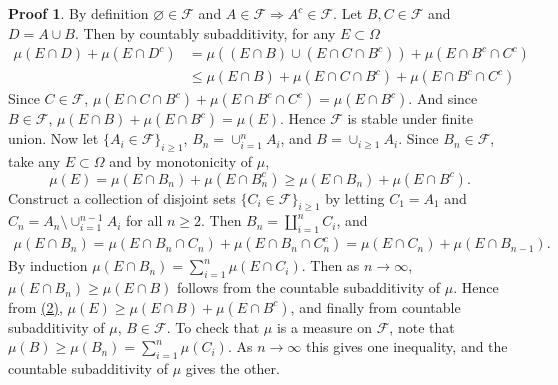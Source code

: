 \documentclass[hidelinks,11pt]{article}
\theoremstyle{definition}
\theoremstyle{dotless}
\newtheorem{prop}{Proof}[section]
\theoremstyle{remark}
\DeclareMathOperator{\1}{\mathbf{1}}
\DeclareMathOperator{\0}{\mathbf{0}}
\begin{document}
\begin{prop}
By definition $\varnothing\in\mathcal{F}$ and $A\in\mathcal{F}\Rightarrow A^c\in\mathcal{F}$. Let $B,C\in\mathcal{F}$ and $D=A\cup B$. Then by countably subadditivity, for any $E\subset\Omega$
\begin{align*}
\mu(E\cap D)+\mu(E\cap D^c)&=\mu((E\cap B)\cup(E\cap C\cap B^c))+\mu(E\cap B^c\cap C^c)\\
&\leq\mu(E\cap B)+\mu(E\cap C\cap B^c)+\mu(E\cap B^c\cap C^c)
\end{align*}
Since $C\in\mathcal{F}$, $\mu(E\cap C\cap B^c)+\mu(E\cap B^c\cap C^c)=\mu(E\cap B^c)$. And since $B\in\mathcal{F}$, $\mu(E\cap B)+\mu(E\cap B^c)=\mu(E)$. Hence $\mathcal{F}$ is stable under finite union.\medbreak
Now let $\{A_i\in\mathcal{F}\}_{i\geq1}$, $B_n=\cup_{i=1}^nA_i$, and $B=\cup_{i\geq1}A_i$. Since $B_n\in\mathcal{F}$, take any $E\subset\Omega$ and by monotonicity of $\mu$,
\[\mu(E)=\mu(E\cap B_n)+\mu(E\cap B_n^c)\geq\mu(E\cap B_n)+\mu(E\cap B^c).\]
Construct a collection of disjoint sets $\{C_i\in\mathcal{F}\}_{i\geq1}$ by letting $C_1=A_1$ and $C_n=A_n\setminus\cup_{i=1}^{n-1}A_i$ for all $n\geq2$. Then $B_n=\amalg_{i=1}^nC_i$, and
\begin{align}\label{(2)}
\mu(E\cap B_n)=\mu(E\cap B_n\cap C_n)+\mu(E\cap B_n\cap C_n^c)=\mu(E\cap C_n)+\mu(E\cap B_{n-1}).
\end{align}
By induction $\mu(E\cap B_n)=\sum_{i=1}^n\mu(E\cap C_i)$. Then as $n\to\infty$, $\mu(E\cap B_n)\geq\mu(E\cap B)$ follows from the countable subadditivity of $\mu$. Hence from \hyperref[(2)]{(2)}, $\mu(E)\geq\mu(E\cap B)+\mu(E\cap B^c)$, and finally from countable subadditivity of $\mu$, $B\in\mathcal{F}$.
\medbreak
To check that $\mu$ is a measure on $\mathcal{F}$, note that $\mu(B)\geq\mu(B_n)=\sum_{i=1}^n\mu(C_i)$. As $n\to\infty$ this gives one inequality, and the countable subadditivity of $\mu$ gives the other.
\end{prop}
\end{document}
